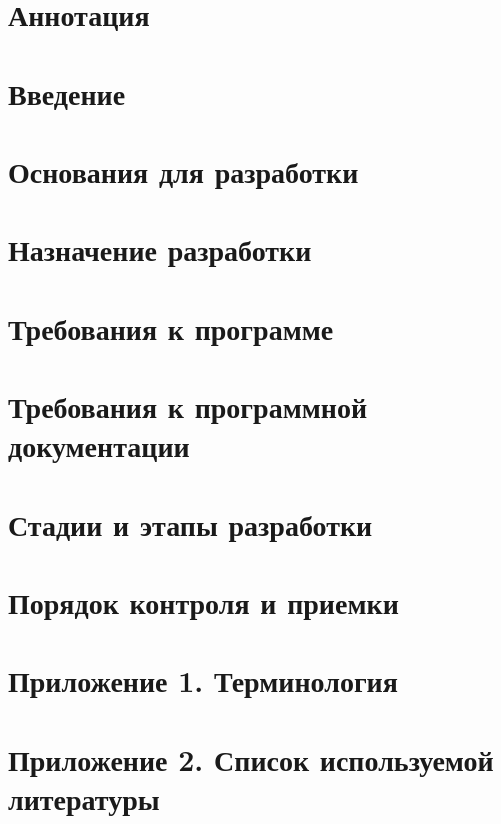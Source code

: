 \documentclass[encoding=utf8]{twoeskd}
\begin{document}
	
	\section{Аннотация}
	
	
	\newpage
	\tableofcontents
	
	
	\newpage
	\section{Введение}
	
	
	\newpage
	\section{Основания для разработки}
	
	
	\newpage
	\section{Назначение разработки}
	
	
	\newpage
	\section{Требования к программе}
	
	
	\newpage
	\section{Требования к программной документации}
	
	
	\newpage
	\section{Стадии и этапы разработки}
	
	
	\newpage
	\section{Порядок контроля и приемки}
	
	
	\newpage
	\section{Приложение 1. Терминология}
	
	
	\newpage
	\section{Приложение 2. Список используемой литературы}
	
	
	\newpage
	\eskdListOfChanges
\end{document}
